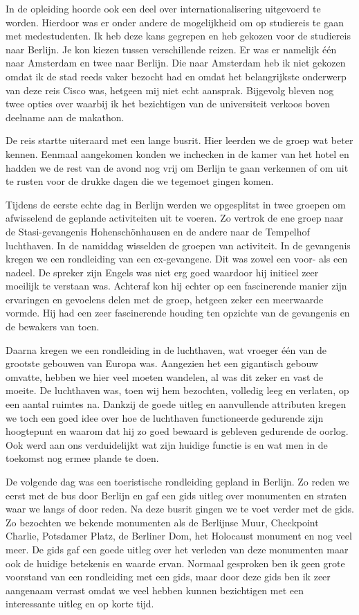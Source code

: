 
In de opleiding hoorde ook een deel over internationalisering uitgevoerd te worden. Hierdoor was er onder andere de mogelijkheid om op studiereis te gaan met medestudenten. Ik heb deze kans gegrepen en heb gekozen voor de studiereis naar Berlijn. Je kon kiezen tussen verschillende reizen. Er was er namelijk één naar Amsterdam en twee naar Berlijn. Die naar Amsterdam heb ik niet gekozen omdat ik de stad reeds vaker bezocht had en omdat het belangrijkste onderwerp van deze reis Cisco was, hetgeen mij niet echt aansprak. Bijgevolg bleven nog twee opties over waarbij ik het bezichtigen van de universiteit verkoos boven deelname aan de makathon.

De reis startte uiteraard met een lange busrit. Hier leerden we de groep wat beter kennen. Eenmaal aangekomen konden we inchecken in de kamer van het hotel en hadden we de rest van de avond nog vrij om Berlijn te gaan verkennen of om uit te rusten voor de drukke dagen die we tegemoet gingen komen.

Tijdens de eerste echte dag in Berlijn werden we opgesplitst in twee groepen om afwisselend de geplande activiteiten uit te voeren. Zo vertrok de ene groep naar de Stasi\hyp{}gevangenis Hohensch\"onhausen en de andere naar de Tempelhof luchthaven. In de namiddag wisselden de groepen van activiteit. In de gevangenis kregen we een rondleiding van een ex\hyp{}gevangene. Dit was zowel een voor\hyp{} als een nadeel. De spreker zijn Engels was niet erg goed waardoor hij initieel zeer moeilijk te verstaan was. Achteraf kon hij echter op een fascinerende manier zijn ervaringen en gevoelens delen met de groep, hetgeen zeker een meerwaarde vormde. Hij had een zeer fascinerende houding ten opzichte van de gevangenis en de bewakers van toen.

Daarna kregen we een rondleiding in de luchthaven, wat vroeger één van de grootste gebouwen van Europa was. Aangezien het een gigantisch gebouw omvatte, hebben we hier veel moeten wandelen, al was dit zeker en vast de moeite. De luchthaven was, toen wij hem bezochten, volledig leeg en verlaten, op een aantal ruimtes na. Dankzij de goede uitleg en aanvullende attributen kregen we toch een goed idee over hoe de luchthaven functioneerde gedurende zijn hoogtepunt en waarom dat hij zo goed bewaard is gebleven gedurende de oorlog. Ook werd aan ons verduidelijkt wat zijn huidige functie is en wat men in de toekomst nog ermee plande te doen.

De volgende dag was een toeristische rondleiding gepland in Berlijn. Zo reden we eerst met de bus door Berlijn en gaf een gids uitleg over monumenten en straten waar we langs of door reden. Na deze busrit gingen we te voet verder met de gids. Zo bezochten we bekende monumenten als de Berlijnse Muur, Checkpoint Charlie, Potsdamer Platz, de Berliner Dom, het Holocaust monument en nog veel meer. De gids gaf een goede uitleg over het verleden van deze monumenten maar ook de huidige betekenis en waarde ervan. Normaal gesproken ben ik geen grote voorstand van een rondleiding met een gids, maar door deze gids ben ik zeer aangenaam verrast omdat we veel hebben kunnen bezichtigen met een interessante uitleg en op korte tijd.


